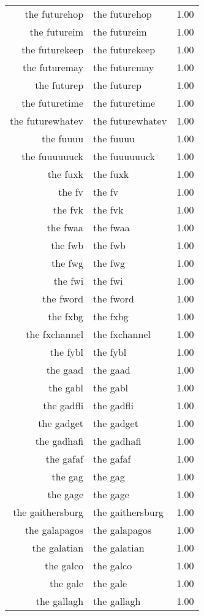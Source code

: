 \begin{table}[ht]
\begin{tabular}{rlr}
  the futurehop & the futurehop & 1.00 \\ 
  the futureim & the futureim & 1.00 \\ 
  the futurekeep & the futurekeep & 1.00 \\ 
  the futuremay & the futuremay & 1.00 \\ 
  the futurep & the futurep & 1.00 \\ 
  the futuretime & the futuretime & 1.00 \\ 
  the futurewhatev & the futurewhatev & 1.00 \\ 
  the fuuuu & the fuuuu & 1.00 \\ 
  the fuuuuuuck & the fuuuuuuck & 1.00 \\ 
  the fuxk & the fuxk & 1.00 \\ 
  the fv & the fv & 1.00 \\ 
  the fvk & the fvk & 1.00 \\ 
  the fwaa & the fwaa & 1.00 \\ 
  the fwb & the fwb & 1.00 \\ 
  the fwg & the fwg & 1.00 \\ 
  the fwi & the fwi & 1.00 \\ 
  the fword & the fword & 1.00 \\ 
  the fxbg & the fxbg & 1.00 \\ 
  the fxchannel & the fxchannel & 1.00 \\ 
  the fybl & the fybl & 1.00 \\ 
  the gaad & the gaad & 1.00 \\ 
  the gabl & the gabl & 1.00 \\ 
  the gadfli & the gadfli & 1.00 \\ 
  the gadget & the gadget & 1.00 \\ 
  the gadhafi & the gadhafi & 1.00 \\ 
  the gafaf & the gafaf & 1.00 \\ 
  the gag & the gag & 1.00 \\ 
  the gage & the gage & 1.00 \\ 
  the gaithersburg & the gaithersburg & 1.00 \\ 
  the galapagos & the galapagos & 1.00 \\ 
  the galatian & the galatian & 1.00 \\ 
  the galco & the galco & 1.00 \\ 
  the gale & the gale & 1.00 \\ 
  the gallagh & the gallagh & 1.00 \\ 

\end{tabular}
\end{table}
